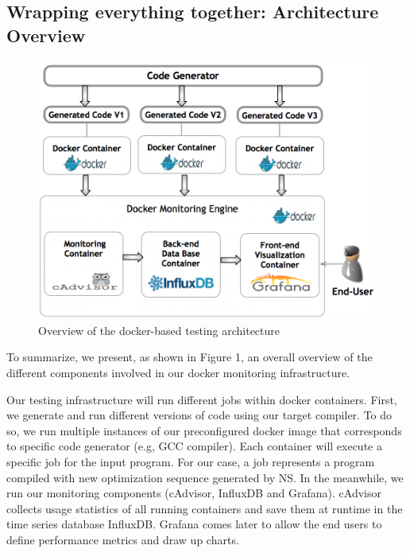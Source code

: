 \subsection{Wrapping everything together: Architecture Overview}
\begin{figure}[b!]
	\includegraphics[scale=0.48]{Ressources/infra.png}
	\caption{Overview of the docker-based testing architecture}
\end{figure}

To summarize, we present, as shown in Figure 1, an overall overview of the different components involved in our docker monitoring infrastructure.

Our testing infrastructure will run different jobs within docker containers. First, we generate and run different versions of code using our target compiler. To do so, we run multiple instances of our preconfigured docker image that corresponds to specific code generator (e.g, GCC compiler). Each container will execute a specific job for the input program. For our case, a job represents a program compiled with new optimization sequence generated by NS. In the meanwhile, we run our monitoring components (cAdvisor, InfluxDB and Grafana). cAdvisor collects usage statistics of all running containers and save them at runtime in the time series database InfluxDB. Grafana comes later to allow the end users to define performance metrics and draw up charts.

